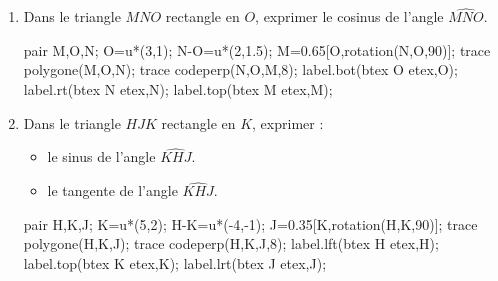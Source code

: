 \begin{exercice*}
    \begin{enumerate}
        \item Dans le triangle $MNO$ rectangle en $O$, exprimer le cosinus de l'angle $\widehat{MNO}$.
        
        \medskip
        \begin{Geometrie}[CoinHD={(6u,4.5u)}]        
            pair M,O,N;
            O=u*(3,1);
            N-O=u*(2,1.5);
            M=0.65[O,rotation(N,O,90)];
            trace polygone(M,O,N);            
            trace codeperp(N,O,M,8);
            label.bot(btex O etex,O);
            label.rt(btex N etex,N);
            label.top(btex M etex,M);
        \end{Geometrie}
        \item Dans le triangle $HJK$ rectangle en $K$, exprimer :
        \begin{itemize}
            \item le sinus de l'angle $\widehat{KHJ}$.
            \item le tangente de l'angle $\widehat{KHJ}$.
        \end{itemize}
        
        \medskip
        \begin{Geometrie}[CoinHD={(6u,4.5u)}]        
            pair H,K,J;
            K=u*(5,2);
            H-K=u*(-4,-1);
            J=0.35[K,rotation(H,K,90)];
            trace polygone(H,K,J);            
            trace codeperp(H,K,J,8);
            label.lft(btex H etex,H);
            label.top(btex  K etex,K);
            label.lrt(btex J etex,J);
        \end{Geometrie}
    \end{enumerate}
\end{exercice*}
